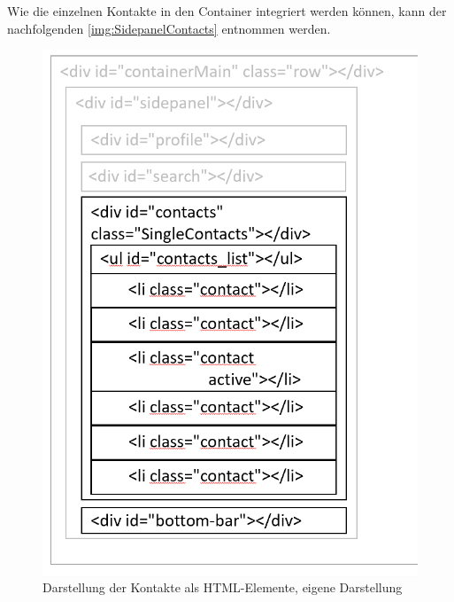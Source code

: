 \documentclass[a4paper,titlepage,halfparskip,12pt]{scrreprt}
\begin{document}
\begin{onehalfspacing}
Wie die einzelnen Kontakte in den Container integriert werden können, kann der nachfolgenden \autoref{img:SidepanelContacts} entnommen werden. 
\begin{figure}[h]
	\begin{minipage}[c]{.48\textwidth}
		\centering
		\includegraphics[scale=0.52]{images/SidepanelContacts}
		\caption{Darstellung der Kontakte als HTML-Elemente, eigene Darstellung}
		\label{img:SidepanelContacts}
	\end{minipage}
	\hspace{0.055\linewidth}%
	\begin{minipage}[c]{.43\textwidth}
		\centering

\end{minipage}
\end{figure}
\end{onehalfspacing}
\end{document}
